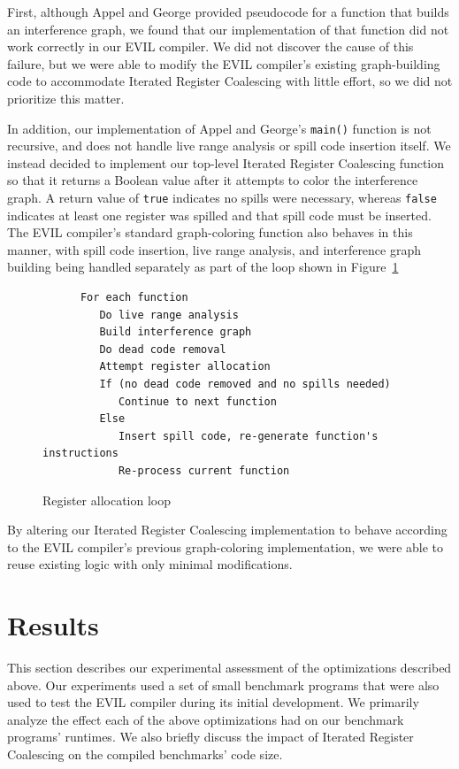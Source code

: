 \documentclass[12pt]{article}
\begin{document}
First, although Appel and George provided pseudocode for a function that builds an interference graph, we found that our implementation of that function did not work correctly in our EVIL compiler.
We did not discover the cause of this failure, but we were able to modify the EVIL compiler's existing graph-building code to accommodate Iterated Register Coalescing with little effort, so we did not prioritize this matter.

In addition, our implementation of Appel and George's {\tt main()} function is not recursive, and does not handle live range analysis or spill code insertion itself.
We instead decided to implement our top-level Iterated Register Coalescing function so that it returns a Boolean value after it attempts to color the interference graph.
A return value of {\tt true} indicates no spills were necessary, whereas {\tt false} indicates at least one register was spilled and that spill code must be inserted.
The EVIL compiler's standard graph-coloring function also behaves in this manner, with spill code insertion, live range analysis, and interference graph building being handled separately as part of the loop shown in Figure~\ref{fig:ircLoop}

\begin{figure}
\begin{verbatim}
      For each function
         Do live range analysis
         Build interference graph
         Do dead code removal
         Attempt register allocation
         If (no dead code removed and no spills needed)
            Continue to next function
         Else
            Insert spill code, re-generate function's instructions
            Re-process current function
\end{verbatim}
\caption{Register allocation loop}
\label{fig:ircLoop}
\end{figure}

By altering our Iterated Register Coalescing implementation to behave according to the EVIL compiler's previous graph-coloring implementation, we were able to reuse existing logic with only minimal modifications.

\section{Results}
This section describes our experimental assessment of the optimizations described above.
Our experiments used a set of small benchmark programs that were also used to test the EVIL compiler during its initial development.
We primarily analyze the effect each of the above optimizations had on our benchmark programs' runtimes.
We also briefly discuss the impact of Iterated Register Coalescing on the compiled benchmarks' code size.
\end{document}
